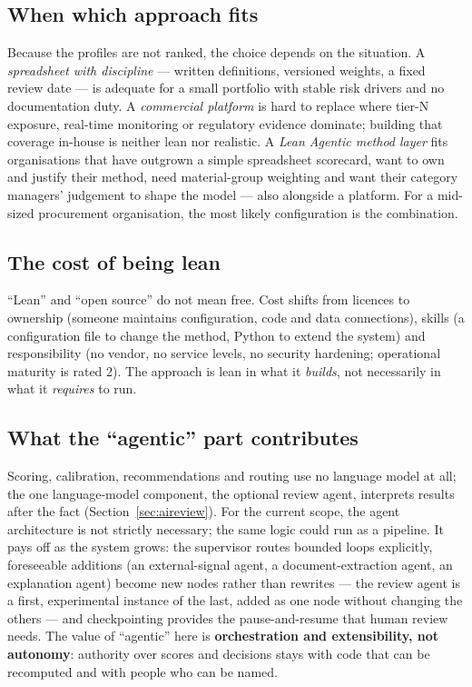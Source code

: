 \documentclass[10pt,twocolumn,a4paper]{article}
\begin{document}
\subsection{When which approach fits}
Because the profiles are not ranked, the choice depends on the situation. A
\emph{spreadsheet with discipline} --- written definitions, versioned weights, a fixed
review date --- is adequate for a small portfolio with stable risk drivers and no
documentation duty. A \emph{commercial platform} is hard to replace where tier-N exposure,
real-time monitoring or regulatory evidence dominate; building that coverage in-house is
neither lean nor realistic. A \emph{Lean Agentic method layer} fits organisations that
have outgrown a simple spreadsheet scorecard, want to own and justify their method, need material-group
weighting and want their category managers' judgement to shape the model --- also
alongside a platform. For a mid-sized procurement organisation, the most likely
configuration is the combination.

\subsection{The cost of being lean}
``Lean'' and ``open source'' do not mean free. Cost shifts from licences to ownership
(someone maintains configuration, code and data connections), skills (a configuration file
to change the method, Python to extend the system) and responsibility (no vendor, no
service levels, no security hardening; operational maturity is rated 2). The approach is
lean in what it \emph{builds}, not necessarily in what it \emph{requires} to run.

\subsection{What the ``agentic'' part contributes}
Scoring, calibration, recommendations and routing use no language model at all; the one
language-model component, the optional review agent, interprets results after the fact
(Section~\ref{sec:aireview}). For the current
scope, the agent architecture is not strictly necessary; the same logic could run as a
pipeline. It pays off as the system grows: the supervisor routes bounded loops explicitly,
foreseeable additions (an external-signal agent, a document-extraction agent, an
explanation agent) become new nodes rather than rewrites --- the review agent is a first,
experimental instance of the last, added as one node without changing the others --- and checkpointing provides the
pause-and-resume that human review needs. The value of ``agentic'' here is
\textbf{orchestration and extensibility, not autonomy}: authority over scores and
decisions stays with code that can be recomputed and with people who can be named.
\end{document}
